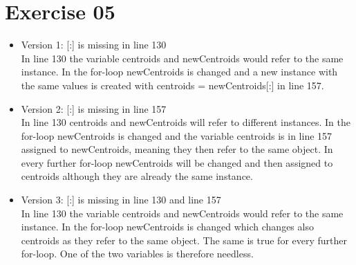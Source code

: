 \documentclass[11pt,a4paper]{scrartcl}
\begin{document}
\section*{Exercise 05}
	\begin{itemize}
		\item Version 1: [:] is missing in line 130 \\
    In line 130 the variable centroids and newCentroids would refer to the same instance. In the for-loop newCentroids is changed and a new instance with the same values is created with centroids = newCentroids[:] in line 157.
		\item Version 2: [:] is missing in line 157 \\
    In line 130 centroids and newCentroids will refer to different instances. In the for-loop newCentroids is changed and the variable centroids is in line 157 assigned to newCentroids, meaning they then refer to the same object. In every further for-loop newCentroids will be changed and then assigned to centroids although they are already the same instance.
		\item Version 3: [:] is missing in line 130 and line 157 \\
    In line 130 the variable centroids and newCentroids would refer to the same instance. In the for-loop newCentroids is changed which changes also centroids as they refer to the same object. The same is true for every further for-loop. One of the two variables is therefore needless.
	\end{itemize}
\end{document}
